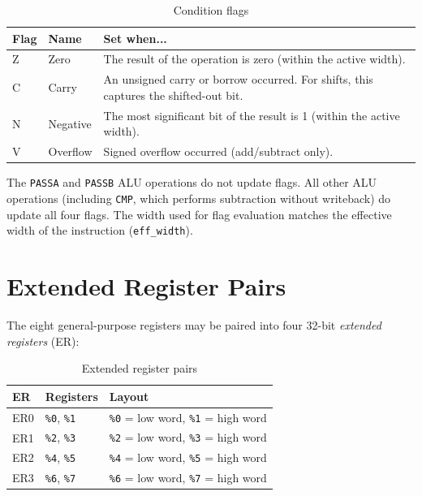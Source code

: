 \documentclass[a4paper,12pt]{report}
\newcommand{\asm}[1]{\texttt{#1}}
\newcommand{\field}[1]{\texttt{\small #1}}
\newcommand{\reg}[1]{\texttt{\%#1}}
\begin{document}
\begin{table}[htbp]
\centering
\caption{Condition flags}
\begin{tabularx}{\textwidth}{llX}
    \toprule
    \textbf{Flag} & \textbf{Name} & \textbf{Set when...} \\
    \midrule
    Z & Zero     & The result of the operation is zero (within the active width). \\
    C & Carry    & An unsigned carry or borrow occurred. For shifts, this captures the shifted-out bit. \\
    N & Negative & The most significant bit of the result is 1 (within the active width). \\
    V & Overflow & Signed overflow occurred (add/subtract only). \\
    \bottomrule
\end{tabularx}
\end{table}

The \asm{PASSA} and \asm{PASSB} ALU operations do not update flags. All other ALU operations (including \asm{CMP}, which performs subtraction without writeback) do update all four flags. The width used for flag evaluation matches the effective width of the instruction (\field{eff\_width}).

\section{Extended Register Pairs}
\label{sec:extended-regs}

The eight general-purpose registers may be paired into four 32-bit \emph{extended registers} (ER):

\begin{table}[htbp]
\centering
\caption{Extended register pairs}
\begin{tabularx}{\textwidth}{llX}
    \toprule
    \textbf{ER} & \textbf{Registers} & \textbf{Layout} \\
    \midrule
    ER0 & \reg{0}, \reg{1} & \reg{0} = low word, \reg{1} = high word \\
    ER1 & \reg{2}, \reg{3} & \reg{2} = low word, \reg{3} = high word \\
    ER2 & \reg{4}, \reg{5} & \reg{4} = low word, \reg{5} = high word \\
    ER3 & \reg{6}, \reg{7} & \reg{6} = low word, \reg{7} = high word \\
    \bottomrule
\end{tabularx}
\end{table}
\end{document}
